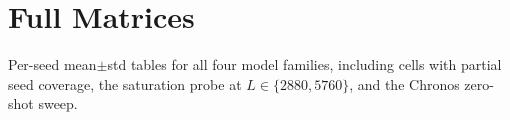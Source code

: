 \section{Full Matrices}
\label{app:full}
Per-seed mean$\pm$std tables for all four model families, including cells with partial seed coverage, the saturation probe at $L \in \{2880, 5760\}$, and the Chronos zero-shot sweep.


